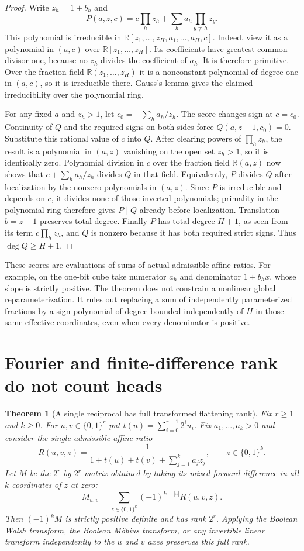 \documentclass[11pt]{article}
\newtheorem{theorem}{Theorem}
\begin{document}
\begin{proof}
Write $z_h=1+b_h$ and
\[
 P(a,z,c)=c\prod_hz_h+\sum_h a_h\prod_{g\ne h}z_g.
\]
This polynomial is irreducible in
$\mathbb R[z_1,\ldots,z_H,a_1,\ldots,a_H,c]$.
Indeed, view it as a polynomial in $(a,c)$ over
$\mathbb R[z_1,\ldots,z_H]$. Its coefficients have greatest common
divisor one, because no $z_h$ divides the coefficient of $a_h$.
It is therefore primitive. Over the fraction field
$\mathbb R(z_1,\ldots,z_H)$ it is a nonconstant polynomial of degree
one in $(a,c)$, so it is irreducible there. Gauss's lemma gives the
claimed irreducibility over the polynomial ring.

For any fixed $a$ and $z_h>1$, let
$c_0=-\sum_h a_h/z_h$. The score changes sign at $c=c_0$.
Continuity of $Q$ and the required signs on both sides force
$Q(a,z-1,c_0)=0$. Substitute this rational value of $c$ into $Q$.
After clearing powers of $\prod_hz_h$, the result is a polynomial
in $(a,z)$ vanishing on the open set $z_h>1$, so it is identically
zero. Polynomial division in $c$ over the fraction field
$\mathbb R(a,z)$ now shows that $c+\sum_h a_h/z_h$ divides $Q$
in that field. Equivalently, $P$ divides $Q$ after localization by
the nonzero polynomials in $(a,z)$. Since $P$ is irreducible and
depends on $c$, it divides none of those inverted polynomials;
primality in the polynomial ring therefore gives $P\mid Q$ already
before localization. Translation $b=z-1$ preserves total degree.
Finally $P$ has total degree $H+1$, as seen from its term
$c\prod_hz_h$, and $Q$ is nonzero because it has both required
strict signs. Thus $\deg Q\geq H+1$.
\end{proof}

These scores are evaluations of sums of actual admissible affine
ratios. For example, on the one-bit cube take numerator $a_h$ and
denominator $1+b_h x$, whose slope is strictly positive. The theorem
does not constrain a nonlinear global reparameterization. It rules
out replacing a sum of independently parameterized fractions by a
sign polynomial of degree bounded independently of $H$ in those same
effective coordinates, even when every denominator is positive.

\section{Fourier and finite-difference rank do not count heads}

\begin{theorem}[A single reciprocal has full transformed flattening rank]
Fix $r\geq1$ and $k\geq0$. For $u,v\in\{0,1\}^r$ put
$t(u)=\sum_{i=0}^{r-1}2^i u_i$. Fix $a_1,\ldots,a_k>0$ and consider
the single admissible affine ratio
\[
 R(u,v,z)=\frac1{1+t(u)+t(v)+\sum_{j=1}^k a_jz_j},
 \qquad z\in\{0,1\}^k.
\]
Let $M$ be the $2^r$ by $2^r$ matrix obtained by taking its mixed
forward difference in all $k$ coordinates of $z$ at zero:
\[
 M_{u,v}=\sum_{z\in\{0,1\}^k}(-1)^{k-|z|}R(u,v,z).
\]
Then $(-1)^kM$ is strictly positive definite and has rank $2^r$.
Applying the Boolean Walsh transform, the Boolean M\"obius transform,
or any invertible linear transform independently to the $u$ and $v$
axes preserves this full rank.
\end{theorem}
\end{document}
